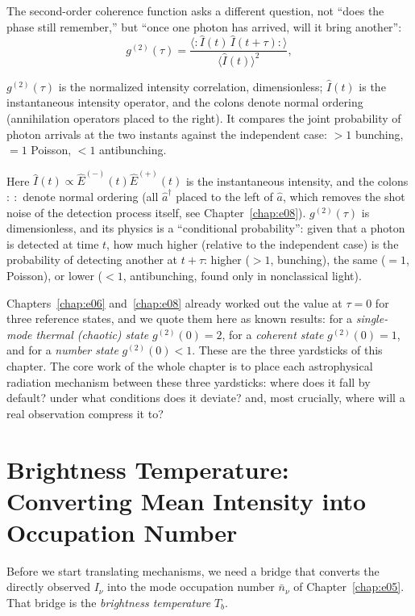 The second-order coherence function asks a different question, not ``does the phase still remember,'' but ``once one photon has arrived, will it bring another'':
\begin{equation}
  g^{(2)}(\tau)=
  \frac{\langle :\!\hat I(t)\,\hat I(t+\tau)\!:\rangle}{\langle \hat I(t)\rangle^2},
  \label{eq:e16-g2}
\end{equation}
\begin{formulaexplain}
\(g^{(2)}(\tau)\) is the normalized intensity correlation, dimensionless; \(\hat I(t)\) is the instantaneous intensity operator, and the colons denote normal ordering (annihilation operators placed to the right). It compares the joint probability of photon arrivals at the two instants against the independent case: \(>1\) bunching, \(=1\) Poisson, \(<1\) antibunching.
\end{formulaexplain}
Here \(\hat I(t)\propto\hat E^{(-)}(t)\hat E^{(+)}(t)\) is the instantaneous intensity, and the colons \(:\ :\) denote normal ordering (all \(\hat a^\dagger\) placed to the left of \(\hat a\), which removes the shot noise of the detection process itself, see Chapter~\ref{chap:e08}). \(g^{(2)}(\tau)\) is dimensionless, and its physics is a ``conditional probability'': given that a photon is detected at time \(t\), how much higher (relative to the independent case) is the probability of detecting another at \(t+\tau\): higher (\(>1\), bunching), the same (\(=1\), Poisson), or lower (\(<1\), antibunching, found only in nonclassical light).

Chapters~\ref{chap:e06} and~\ref{chap:e08} already worked out the value at \(\tau=0\) for three reference states, and we quote them here as known results: for a \emph{single-mode thermal (chaotic) state} \(g^{(2)}(0)=2\), for a \emph{coherent state} \(g^{(2)}(0)=1\), and for a \emph{number state} \(g^{(2)}(0)<1\). These are the three yardsticks of this chapter. The core work of the whole chapter is to place each astrophysical radiation mechanism between these three yardsticks: where does it fall by default? under what conditions does it deviate? and, most crucially, where will a real observation compress it to?

\section{Brightness Temperature: Converting Mean Intensity into Occupation Number}
\label{sec:e16-brightness}

Before we start translating mechanisms, we need a bridge that converts the directly observed \(I_\nu\) into the mode occupation number \(\bar n_\nu\) of Chapter~\ref{chap:e05}. That bridge is the \emph{brightness temperature} \(T_b\).

